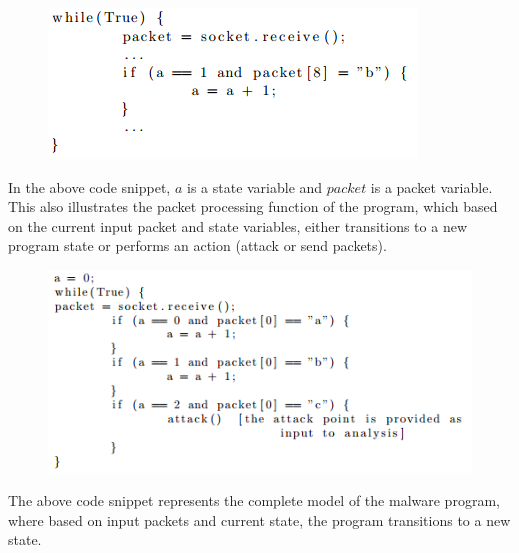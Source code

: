 \documentclass[twocolumn, 11pt]{paper}
\begin{document}
\begin{figure}[h]
	\includegraphics[width=\columnwidth]{code.PNG}
	\label{fig:code1}
\end{figure}
In the above code snippet, $a$ is a state variable
and $packet$ is a packet variable. This also
illustrates the packet processing 
function of the program, which based on the current
input packet and state variables, either transitions
to a new program state or performs an action (attack or
send packets). 
\begin{figure}[h]
	\includegraphics[width=\columnwidth]{code2.PNG}
	\label{fig:code2}
\end{figure}
The above code snippet represents the complete model
of the malware program, where based on input packets and
current state, the program transitions to a new state. 
%
\end{document}
